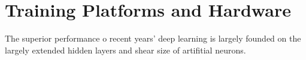 \section{Training Platforms and Hardware}
The superior performance o recent years' deep learning is largely founded on the largely extended hidden layers and shear size of artifitial neurons. 